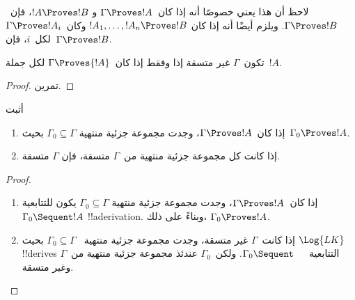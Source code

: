 \documentclass[../../../include/open-logic-section]{subfiles}
\begin{document}
لاحظ أن هذا يعني خصوصًا أنه إذا كان~$\Gamma \Proves !A$ و
$!A \Proves !B$، فإن~$\Gamma \Proves !B$. ويلزم أيضًا أنه إذا كان
$!A_1, \dots, !A_n \Proves !B$ وكان~$\Gamma \Proves !A_i$ لكل~$i$،
فإن~$\Gamma \Proves !B$.

\begin{prop}
تكون~$\Gamma$ غير متسقة إذا وفقط إذا كان~$\Gamma \Proves {!A}$ لكل
  جملة~$!A$.
\end{prop}

\begin{proof}
تمرين.
\end{proof}

\begin{prob}
أثبت 
\end{prob}

\begin{prop}[التراص]
  \begin{enumerate}
  \item إذا كان~$\Gamma \Proves !A$، وجدت مجموعة جزئية منتهية
    $\Gamma_0 \subseteq \Gamma$ بحيث~$\Gamma_0 \Proves !A$.
  \item إذا كانت كل مجموعة جزئية منتهية من~$\Gamma$ متسقة، فإن
    $\Gamma$ متسقة.
  \end{enumerate}
\end{prop}

\begin{proof}
  \begin{enumerate}
    \item إذا كان~$\Gamma \Proves !A$، وجدت مجموعة جزئية منتهية
      $\Gamma_0 \subseteq \Gamma$ يكون للتتابعية
      $\Gamma_0 \Sequent !A$ !!a{derivation}. وبناءً على ذلك،
      $\Gamma_0 \Proves !A$.
    \item إذا كانت~$\Gamma$ غير متسقة، وجدت مجموعة جزئية منتهية
      ~$\Gamma_0 \subseteq \Gamma$ بحيث $\Log{LK}$ !!{derive}s
      التتابعية~$\Gamma_0 \Sequent \quad$. ولكن~$\Gamma_0$ عندئذ
      مجموعة جزئية منتهية من~$\Gamma$ وغير متسقة.
  \end{enumerate}
\end{proof}
\end{document}
